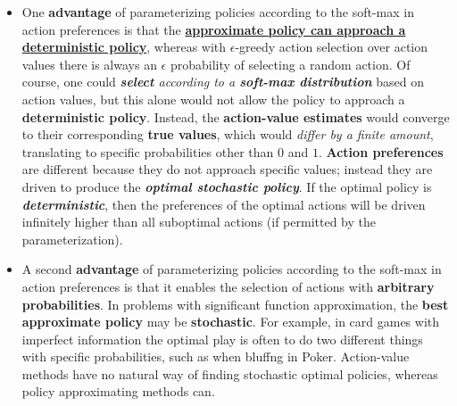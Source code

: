 \documentclass[11pt]{article}
\begin{document}
\begin{itemize}
\begin{itemize}
\item One \textbf{advantage} of parameterizing policies according to the soft-max in action preferences is that the \textbf{\underline{approximate policy can approach a deterministic policy}}, whereas with $\epsilon$-greedy action selection over action values there is always an $\epsilon$ probability of selecting a random action. Of course, one could \emph{\textbf{select} according to a \textbf{soft-max distribution}} based on action values, but this alone would not allow the policy to approach a \textbf{deterministic policy}. Instead, the \textbf{action-value estimates} would converge to their corresponding \textbf{true values}, which would \emph{differ by a finite amount}, translating to specific probabilities other than $0$ and $1$. \textbf{Action preferences} are different because they do not approach specific values; instead they are driven to produce the \emph{\textbf{optimal stochastic policy}}. If the optimal policy is \emph{\textbf{deterministic}}, then the preferences of the optimal actions will be driven infinitely higher than all suboptimal actions (if permitted by the parameterization).

\item A second \textbf{advantage} of parameterizing policies according to the soft-max in action preferences is that it enables the selection of actions with \textbf{arbitrary probabilities}. In problems with significant function approximation, the \textbf{best approximate policy} may be \textbf{stochastic}. For example, in card games with imperfect information the optimal play is often to do two different things with specific probabilities, such as when bluffng in Poker. Action-value methods have no natural way of finding stochastic optimal policies, whereas policy approximating methods can. 
\end{itemize}



\end{itemize}
\end{document}

